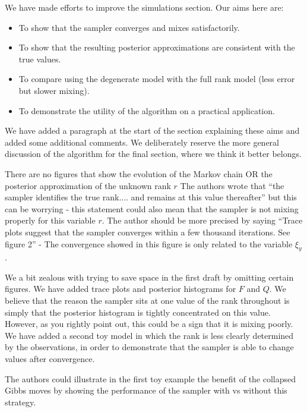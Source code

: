 \documentclass{article}
\newenvironment{review}[0]{\begin{itshape}\color{Gray}\noindent}{\end{itshape}\vspace{0.4cm}}
\newenvironment{response}[0]{\noindent}{\vspace{0.4cm}}
\begin{document}
\begin{response}
 We have made efforts to improve the simulations section. Our aims here are:
 \begin{itemize}
  \item To show that the sampler converges and mixes satisfactorily.
  \item To show that the resulting posterior approximations are consistent with the true values.
  \item To compare using the degenerate model with the full rank model (less error but slower mixing).
  \item To demonstrate the utility of the algorithm on a practical application.
 \end{itemize}
We have added a paragraph at the start of the section explaining these aims and added some additional comments. We deliberately reserve the more general discussion of the algorithm for the final section, where we think it better belongs.
\end{response}

\begin{review}
There are no figures that show the evolution of the Markov chain OR the posterior approximation of the unknown rank $r$
The authors wrote that ``the sampler identifies the true rank.... and remains at this value thereafter'' but this can be worrying - this statement could also mean that the sampler is not mixing properly for this variable $r$. The author should be more precised by saying ``Trace plots suggest that the sampler converges within a few thousand iterations. See figure 2'' - The convergence showed in this figure is only related to the variable $\xi_y$.
\end{review}

\begin{response}
We a bit zealous with trying to save space in the first draft by omitting certain figures. We have added trace plots and posterior histograms for $F$ and $Q$. We believe that the reason the sampler sits at one value of the rank throughout is simply that the posterior histogram is tightly concentrated on this value. However, as you rightly point out, this could be a sign that it is mixing poorly. We have added a second toy model in which the rank is less clearly determined by the observations, in order to demonstrate that the sampler is able to change values after convergence.
\end{response}

\begin{review}
The authors could illustrate in the first toy example the benefit of the collapsed Gibbs moves by showing the performance of the sampler with vs without this strategy.
\end{review}
\end{document}
